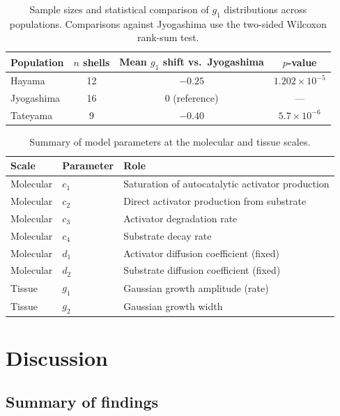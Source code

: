 \documentclass[11pt]{article}
\begin{document}
\begin{table}[htbp]
\centering
\caption{Sample sizes and statistical comparison of $g_1$ distributions
across populations. Comparisons against Jyogashima use the two-sided
Wilcoxon rank-sum test.}
\label{tab:populations}
\begin{tabular}{lccc}
\toprule
Population & $n$ shells & Mean $g_1$ shift vs.\ Jyogashima & $p$-value \\
\midrule
Hayama     & 12 & $-0.25$ & $1.202 \times 10^{-5}$ \\
Jyogashima & 16 & $0$ (reference) & --- \\
Tateyama   & 9  & $-0.40$ & $5.7 \times 10^{-6}$ \\
\bottomrule
\end{tabular}
\end{table}

\begin{table}[htbp]
\centering
\caption{Summary of model parameters at the molecular and tissue scales.}
\label{tab:parameters}
\begin{tabular}{lll}
\toprule
Scale & Parameter & Role \\
\midrule
Molecular & $c_1$ & Saturation of autocatalytic activator production \\
Molecular & $c_2$ & Direct activator production from substrate \\
Molecular & $c_3$ & Activator degradation rate \\
Molecular & $c_4$ & Substrate decay rate \\
Molecular & $d_1$ & Activator diffusion coefficient (fixed) \\
Molecular & $d_2$ & Substrate diffusion coefficient (fixed) \\
Tissue    & $g_1$ & Gaussian growth amplitude (rate) \\
Tissue    & $g_2$ & Gaussian growth width \\
\bottomrule
\end{tabular}
\end{table}

\section{Discussion}
\label{sec:discussion}

\subsection{Summary of findings}
\end{document}

